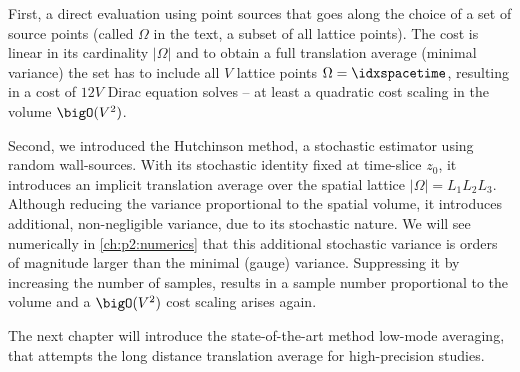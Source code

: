 First, a direct evaluation using point sources that goes along the choice of a set of source points (called $\Omega$ in the text, a subset of all lattice points).
The cost is linear in its cardinality $\lvert \Omega \rvert$ and to obtain a full translation average (\ie minimal variance) the set has to include all $V$ lattice points $\Omega = \idxspacetime$, resulting in a cost of $12 V$ Dirac equation solves -- at least a quadratic cost scaling in the volume $\bigO(V^{2})$.

Second, we introduced the Hutchinson method, a stochastic estimator using random wall-sources.
With its stochastic identity fixed at time-slice $z_0$, it introduces an implicit translation average over the spatial lattice $\lvert \Omega \rvert = L_1 L_2 L_3$.
Although reducing the variance proportional to the spatial volume, it introduces additional, non-negligible variance, due to its stochastic nature.
We will see numerically in \cref{ch:p2:numerics} that this additional stochastic variance is orders of magnitude larger than the minimal (gauge) variance.
Suppressing it by increasing the number of samples, results in a sample number proportional to the volume and a $\bigO(V^{2})$ cost scaling arises again.

The next chapter will introduce the state-of-the-art method low-mode averaging, that attempts the long distance translation average for high-precision studies.

